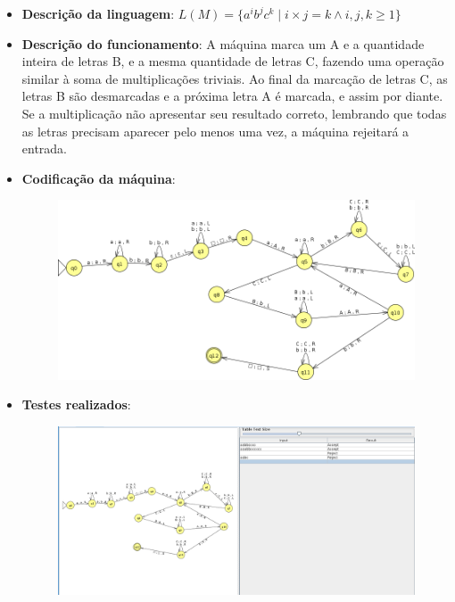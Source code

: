 \documentclass{../sftex/sftex}
\begin{document}
\begin{itemize}

    \item \textbf{Descrição da linguagem}:
        $L(M) = \{a^{i}b^{j}c^{k} \mid i \times j = k \land i,j,k \geq 1\}$

    \item \textbf{Descrição do funcionamento}: A máquina marca um A e a
        quantidade inteira de letras B, e a mesma quantidade de letras C,
        fazendo uma operação similar à soma de multiplicações triviais. Ao
        final da marcação de letras C, as letras B são desmarcadas e a próxima
        letra A é marcada, e assim por diante. Se a multiplicação não
        apresentar seu resultado correto, lembrando que todas as letras
        precisam aparecer pelo menos uma vez, a máquina rejeitará a entrada.

    \item \textbf{Codificação da máquina}:

        \begin{figure}[htbp]
            \centering
            \includegraphics[scale=0.5]{images/questao2_ss.png}
        \end{figure}

	\item \textbf{Testes realizados}:

        \begin{figure}[htbp]
            \centering
            \includegraphics[width=\textwidth]{images/questao2_inputs.png}
        \end{figure}

\end{itemize}
\end{document}

